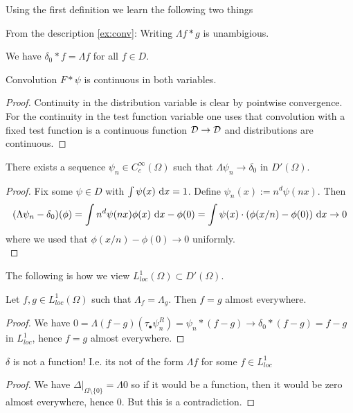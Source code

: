 	Using the first definition we learn the following two things 
	\begin{example}
		From the description \ref{ex:conv}: Writing $\Lambda f * g$ is unambigious. 
	\end{example}
	\begin{example}
		We have $\delta_0 * f = \Lambda f$ for all $f \in D$. 
	\end{example}
	\begin{lemma}{\label{lemma:cont}}
		Convolution $F * \psi$ is continuous in both variables. 
	\end{lemma}
	\begin{proof}
		Continuity in the distribution variable is clear by pointwise convergence. \\
		For the continuity in the test function variable one uses that convolution with a fixed test function is a continuous function $\mathcal{D} \to \mathcal{D}$ and distributions are continuous.  
	\end{proof}
	\begin{proposition}{\label{proposition:deltaInClosure}}
		There exists a sequence $\psi_n \in C_c^{\infty}(\Omega)$ such that $\Lambda \psi_n \to \delta_0$ in $D'(\Omega)$.    
	\end{proposition}
	\begin{proof}
		Fix some $\psi \in D$ with $\int \psi(x) \ \mathrm{d} x = 1$. Define $\psi_n (x) := n^d \psi(nx)$. Then 
		\[
		(\Lambda \psi_n - \delta_0) (\phi )  = \int n^d \psi (n x) \phi(x) \ \mathrm{d} x - \phi(0) = \int \psi (x) \cdot (\phi(x / n) - \phi(0)) \ \mathrm{d} x \to 0
		\]
		where we used that $\phi(x/n) - \phi(0) \to 0$ uniformly. \\
	\end{proof}
	The following is how we view $L^1_{loc}(\Omega) \subset D'(\Omega)$.
	\begin{corollary}
		Let $f,g \in L^1_{loc}(\Omega)$ such that $\Lambda_f = \Lambda_g$. Then $f = g$ almost everywhere. 
	\end{corollary}
	\begin{proof}
		We have $0 = \Lambda(f-g)(\tau_{\bullet} \psi_n^R) = \psi_n * (f - g) \to \delta_0 * (f-g) = f-g$ in $L^1_{loc}$, hence $f = g$ almost everywhere.
	\end{proof}
	\begin{example}
		$\delta$ is not a function! I.e. its not of the form $\Lambda f$ for some $f \in L^1_{loc}$
	\end{example}
	\begin{proof}
		We have $\Delta|_{\Omega \setminus \{0\}}= \Lambda 0$ so if it would be a function, then it would be zero almost everywhere, hence 0. But this is a contradiction. 
	\end{proof}
